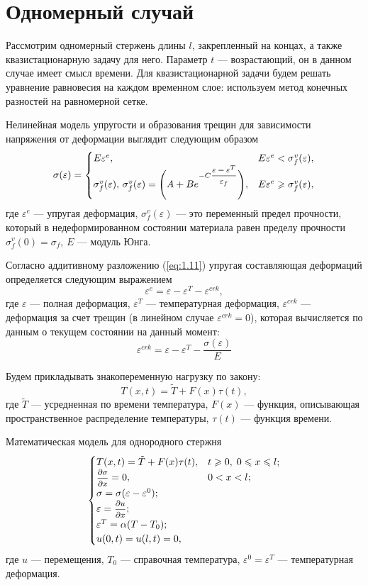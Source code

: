 \documentclass[12pt, a4paper]{article}
\begin{document}
	\section{Одномерный случай}
	Рассмотрим одномерный стержень длины $l$, закрепленный на концах, а также квазистационарную задачу для него. Параметр $t$ --- возрастающий, он в данном случае имеет смысл времени. Для квазистационарной задачи будем решать уравнение равновесия на каждом временном слое: используем метод конечных разностей на равномерной сетке.
	
	Нелинейная модель упругости и образования трещин для зависимости напряжения от деформации выглядит следующим образом
	\begin{equation}
		\sigma(\varepsilon) =
		\begin{cases}
			E\varepsilon^e,& E\varepsilon^e<\sigma_f^v(\varepsilon),
			\\
			\sigma_f^v(\varepsilon),\,\sigma_f^v(\varepsilon)=\Biggl(A+Be^{-C\hbox{\footnotesize$\displaystyle\frac{\varepsilon-\varepsilon^T}{\varepsilon_f}$}}\Biggr),& E\varepsilon^e\geqslant\sigma_f^v(\varepsilon),
		\end{cases}
	\label{eq:2.1}
	\end{equation}
где $\varepsilon^e$ --- упругая деформация, $\sigma_f^v(\varepsilon)$ --- это переменный предел прочности, который в недеформированном состоянии материала равен пределу прочности $\sigma_f^v(0) = \sigma_f$, $E$ --- модуль Юнга.

Согласно аддитивному разложению (\ref{eq:1.11}) упругая составляющая деформаций определяется следующим выражением
\begin{equation}
\varepsilon^e = \varepsilon - \varepsilon^T-\varepsilon^{crk},	
\end{equation}
где $\varepsilon$ --- полная деформация, $\varepsilon^T$ --- температурная деформация, $\varepsilon^{crk}$ --- деформация за счет трещин (в линейном случае $\varepsilon^{crk}=0$), которая вычисляется по данным о текущем состоянии на данный момент:
\[
\varepsilon^{crk} = \varepsilon-\varepsilon^T-\frac{\sigma(\varepsilon)}{E}
\]

Будем прикладывать знакопеременную нагрузку по закону:
\[
T(x,t) = \tilde T+F(x)\tau(t),
\]
где $\tilde T$ --- усредненная по времени температура, $F(x)$ --- функция, описывающая пространственное распределение температуры, $\tau(t)$ --- функция времени.

Математическая модель для однородного стержня
\begin{equation}
	\begin{cases}
		T(x,t) = \tilde T+F(x)\tau(t),& t \geqslant 0,\; 0 \leqslant x\leqslant l;\\
		\hbox{\footnotesize$\displaystyle\frac{\partial \sigma}{\partial x}$} = 0,& 0<x<l;\\
		\sigma = \sigma(\varepsilon-\varepsilon^0);\\
		\varepsilon = \hbox{\footnotesize$\displaystyle\frac{\partial u}{\partial x}$};\\
		\varepsilon^T = \alpha(T-T_0);\\
		u(0,t) = u(l,t) = 0,		
	\end{cases}
\end{equation}
где $u$ --- перемещения, $T_0$ --- справочная температура, $\varepsilon^0 = \varepsilon^T$ --- температурная деформация. 
\end{document}
